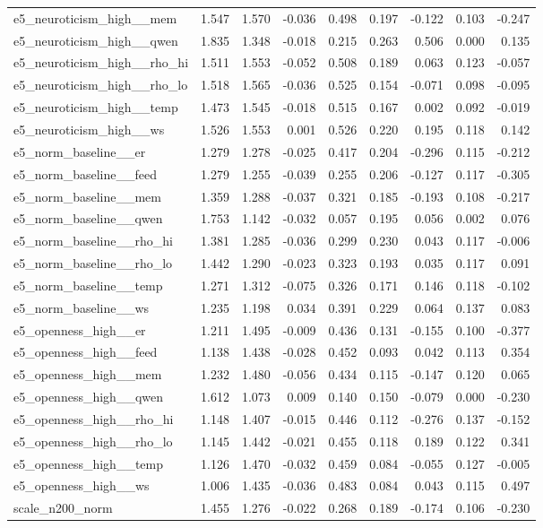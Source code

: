 \documentclass[11pt]{article}
\begin{document}
\begin{landscape}
\begin{longtable}{@{}lrrrrrrrr@{}}
e5\_neuroticism\_high\_\_mem & 1.547 & 1.570 & -0.036 & 0.498 & 0.197 & -0.122 & 0.103 & -0.247 \\
e5\_neuroticism\_high\_\_qwen & 1.835 & 1.348 & -0.018 & 0.215 & 0.263 & 0.506 & 0.000 & 0.135 \\
e5\_neuroticism\_high\_\_rho\_hi & 1.511 & 1.553 & -0.052 & 0.508 & 0.189 & 0.063 & 0.123 & -0.057 \\
e5\_neuroticism\_high\_\_rho\_lo & 1.518 & 1.565 & -0.036 & 0.525 & 0.154 & -0.071 & 0.098 & -0.095 \\
e5\_neuroticism\_high\_\_temp & 1.473 & 1.545 & -0.018 & 0.515 & 0.167 & 0.002 & 0.092 & -0.019 \\
e5\_neuroticism\_high\_\_ws & 1.526 & 1.553 & 0.001 & 0.526 & 0.220 & 0.195 & 0.118 & 0.142 \\
e5\_norm\_baseline\_\_er & 1.279 & 1.278 & -0.025 & 0.417 & 0.204 & -0.296 & 0.115 & -0.212 \\
e5\_norm\_baseline\_\_feed & 1.279 & 1.255 & -0.039 & 0.255 & 0.206 & -0.127 & 0.117 & -0.305 \\
e5\_norm\_baseline\_\_mem & 1.359 & 1.288 & -0.037 & 0.321 & 0.185 & -0.193 & 0.108 & -0.217 \\
e5\_norm\_baseline\_\_qwen & 1.753 & 1.142 & -0.032 & 0.057 & 0.195 & 0.056 & 0.002 & 0.076 \\
e5\_norm\_baseline\_\_rho\_hi & 1.381 & 1.285 & -0.036 & 0.299 & 0.230 & 0.043 & 0.117 & -0.006 \\
e5\_norm\_baseline\_\_rho\_lo & 1.442 & 1.290 & -0.023 & 0.323 & 0.193 & 0.035 & 0.117 & 0.091 \\
e5\_norm\_baseline\_\_temp & 1.271 & 1.312 & -0.075 & 0.326 & 0.171 & 0.146 & 0.118 & -0.102 \\
e5\_norm\_baseline\_\_ws & 1.235 & 1.198 & 0.034 & 0.391 & 0.229 & 0.064 & 0.137 & 0.083 \\
e5\_openness\_high\_\_er & 1.211 & 1.495 & -0.009 & 0.436 & 0.131 & -0.155 & 0.100 & -0.377 \\
e5\_openness\_high\_\_feed & 1.138 & 1.438 & -0.028 & 0.452 & 0.093 & 0.042 & 0.113 & 0.354 \\
e5\_openness\_high\_\_mem & 1.232 & 1.480 & -0.056 & 0.434 & 0.115 & -0.147 & 0.120 & 0.065 \\
e5\_openness\_high\_\_qwen & 1.612 & 1.073 & 0.009 & 0.140 & 0.150 & -0.079 & 0.000 & -0.230 \\
e5\_openness\_high\_\_rho\_hi & 1.148 & 1.407 & -0.015 & 0.446 & 0.112 & -0.276 & 0.137 & -0.152 \\
e5\_openness\_high\_\_rho\_lo & 1.145 & 1.442 & -0.021 & 0.455 & 0.118 & 0.189 & 0.122 & 0.341 \\
e5\_openness\_high\_\_temp & 1.126 & 1.470 & -0.032 & 0.459 & 0.084 & -0.055 & 0.127 & -0.005 \\
e5\_openness\_high\_\_ws & 1.006 & 1.435 & -0.036 & 0.483 & 0.084 & 0.043 & 0.115 & 0.497 \\
scale\_n200\_norm & 1.455 & 1.276 & -0.022 & 0.268 & 0.189 & -0.174 & 0.106 & -0.230 \\
\bottomrule
\end{longtable}
\normalsize
\end{landscape}
\end{document}
